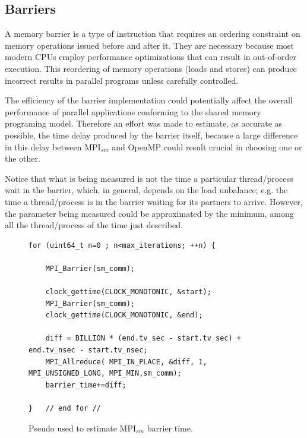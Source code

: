 \newpage

\subsection*{Barriers}

A memory barrier is a type of instruction that requires an ordering constraint on memory operations issued before and after it. They are necessary because most modern CPUs employ performance optimizations that can result in out-of-order execution. This reordering of memory operations (loads and stores) can produce incorrect results in parallel programs unless carefully controlled.

\medskip

The efficiency of the barrier implementation could potentially affect the overall performance of parallel applications conforming to the shared memory programing model. Therefore an effort was made to estimate, as accurate as possible, the time delay produced by the barrier itself, because a large difference in this delay between MPI$_{sm}$ and OpenMP could result crucial in choosing one or the other.

\medskip


Notice that what is being measured is not the time a particular thread/process wait in the barrier, which, in general, depends on the load unbalance; e.g. the time a thread/process is in the barrier waiting for its partners to arrive. However, the parameter being measured could be approximated by the minimum, among all the thread/process of the
time just described.




\medskip


\begin{figure} [h!]
\centering
\captionsetup{justification=centering, singlelinecheck=false}
    
\begin{lstlisting}[style=CStyle]
for (uint64_t n=0 ; n<max_iterations; ++n) {

    MPI_Barrier(sm_comm);
        
    clock_gettime(CLOCK_MONOTONIC, &start);
    MPI_Barrier(sm_comm);    
    clock_gettime(CLOCK_MONOTONIC, &end);
    
    diff = BILLION * (end.tv_sec - start.tv_sec) + end.tv_nsec - start.tv_nsec;
    MPI_Allreduce( MPI_IN_PLACE, &diff, 1, MPI_UNSIGNED_LONG, MPI_MIN,sm_comm);
    barrier_time+=diff;

}	// end for //
\end{lstlisting}    
\caption{Pseudo used to estimate MPI$_{sm}$ barrier time.}
\label{fig:PseudoCode3}
\end{figure}



